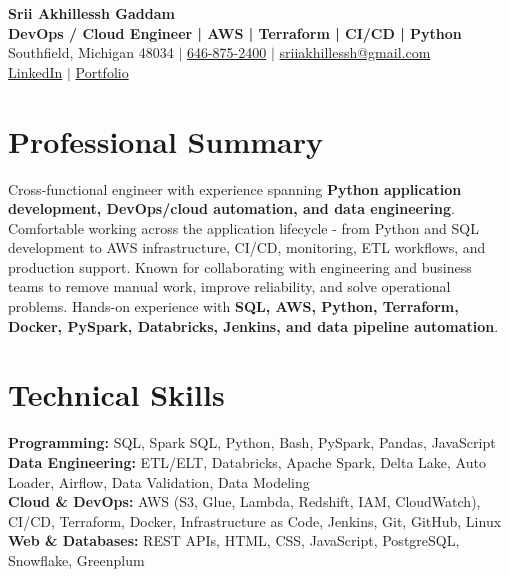 \documentclass[letterpaper,10pt]{article}
\begin{document}
\fontsize{9.35pt}{10.45pt}\selectfont

\begin{center}
    {\LARGE \textbf{Srii Akhillessh Gaddam}} \\[-1pt]
    \textbf{DevOps / Cloud Engineer | AWS | Terraform | CI/CD | Python} \\[2pt]
    Southfield, Michigan 48034 $|$
    \href{tel:6468752400}{646-875-2400} $|$
    \href{mailto:sriiakhillessh@gmail.com}{sriiakhillessh@gmail.com} \\[1pt]
    \href{https://www.linkedin.com/in/srii-akhiilessh-gaddam-b48668191/}{LinkedIn} $|$
    \href{https://sriiakhillesshg.github.io/portfolio/}{Portfolio}
\end{center}
\vspace{-8pt}

\section{Professional Summary}
\small{Cross-functional engineer with experience spanning \textbf{Python application development, DevOps/cloud automation, and data engineering}. Comfortable working across the application lifecycle - from Python and SQL development to AWS infrastructure, CI/CD, monitoring, ETL workflows, and production support. Known for collaborating with engineering and business teams to remove manual work, improve reliability, and solve operational problems. Hands-on experience with \textbf{SQL, AWS, Python, Terraform, Docker, PySpark, Databricks, Jenkins, and data pipeline automation}.}

\section{Technical Skills}
\small{
\textbf{Programming:} SQL, Spark SQL, Python, Bash, PySpark, Pandas, JavaScript \\
\textbf{Data Engineering:} ETL/ELT, Databricks, Apache Spark, Delta Lake, Auto Loader, Airflow, Data Validation, Data Modeling \\
\textbf{Cloud \& DevOps:} AWS (S3, Glue, Lambda, Redshift, IAM, CloudWatch), CI/CD, Terraform, Docker, Infrastructure as Code, Jenkins, Git, GitHub, Linux \\
\textbf{Web \& Databases:} REST APIs, HTML, CSS, JavaScript, PostgreSQL, Snowflake, Greenplum
}
\end{document}
